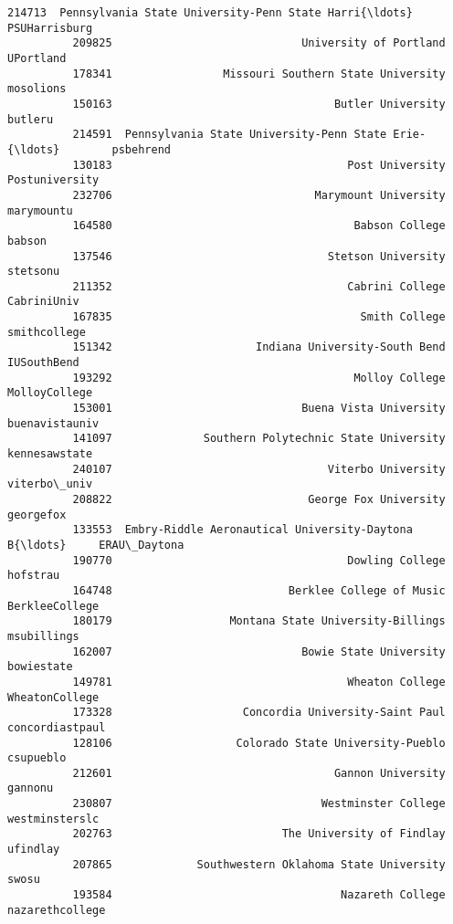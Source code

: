 \documentclass[11pt]{article}
\begin{document}
\begin{Verbatim}[commandchars=\\\{\}]
          214713  Pennsylvania State University-Penn State Harri{\ldots}    PSUHarrisburg   
          209825                             University of Portland        UPortland   
          178341                 Missouri Southern State University        mosolions   
          150163                                  Butler University          butleru   
          214591  Pennsylvania State University-Penn State Erie-{\ldots}        psbehrend   
          130183                                    Post University   Postuniversity   
          232706                               Marymount University       marymountu   
          164580                                     Babson College           babson   
          137546                                 Stetson University         stetsonu   
          211352                                    Cabrini College     CabriniUniv    
          167835                                      Smith College     smithcollege   
          151342                      Indiana University-South Bend      IUSouthBend   
          193292                                     Molloy College    MolloyCollege   
          153001                             Buena Vista University   buenavistauniv   
          141097              Southern Polytechnic State University    kennesawstate   
          240107                                 Viterbo University     viterbo\_univ   
          208822                              George Fox University        georgefox   
          133553  Embry-Riddle Aeronautical University-Daytona B{\ldots}     ERAU\_Daytona   
          190770                                    Dowling College         hofstrau   
          164748                           Berklee College of Music   BerkleeCollege   
          180179                  Montana State University-Billings      msubillings   
          162007                             Bowie State University       bowiestate   
          149781                                    Wheaton College   WheatonCollege   
          173328                    Concordia University-Saint Paul  concordiastpaul   
          128106                   Colorado State University-Pueblo        csupueblo   
          212601                                  Gannon University          gannonu   
          230807                                Westminster College   westminsterslc   
          202763                          The University of Findlay         ufindlay   
          207865             Southwestern Oklahoma State University            swosu   
          193584                                   Nazareth College  nazarethcollege   

\end{Verbatim}
\end{document}
